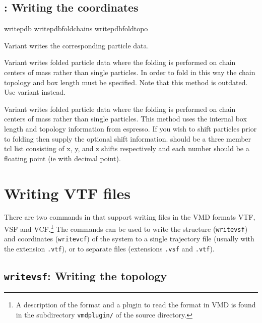 \subsection{: Writing the coordinates}

\begin{essyntax}
   writepdb 
   writepdbfoldchains  
    
   writepdbfoldtopo  
\end{essyntax}

Variant  writes the corresponding particle data. 

Variant  writes folded particle data where the folding is
performed on chain centers of mass rather than single particles. In
order to fold in this way the chain topology and box length must be
specified.  Note that this method is outdated. Use variant 
instead.

Variant  writes folded particle data where the folding is
performed on chain centers of mass rather than single particles. This
method uses the internal box length and topology information from
espresso. If you wish to shift particles prior to folding then supply
the optional shift information.  should be a three member
tcl list consisting of x, y, and z shifts respectively and each number
should be a floating point (ie with decimal point).

\section{Writing VTF files}

There are two commands in \es{} that support writing files in the VMD
formats VTF, VSF and VCF.\footnote{A description of the format and a
  plugin to read the format in VMD is found in the subdirectory
  \texttt{vmdplugin/} of the \es{} source directory.} The commands can
be used to write the structure (\texttt{writevsf}) and coordinates
(\texttt{writevcf}) of the system to a single trajectory file (usually
with the extension \texttt{.vtf}), or to separate files (extensions
\texttt{.vsf} and \texttt{.vtf}).

\subsection{\texttt{writevsf}: Writing the topology}


